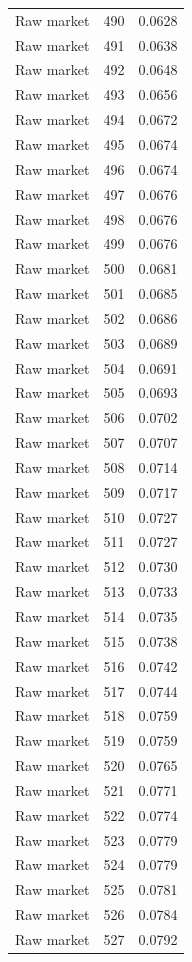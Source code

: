 \begin{table}[htbp]
\begin{tabular}{lll}
Raw market & 490 & 0.0628 \\
Raw market & 491 & 0.0638 \\
Raw market & 492 & 0.0648 \\
Raw market & 493 & 0.0656 \\
Raw market & 494 & 0.0672 \\
Raw market & 495 & 0.0674 \\
Raw market & 496 & 0.0674 \\
Raw market & 497 & 0.0676 \\
Raw market & 498 & 0.0676 \\
Raw market & 499 & 0.0676 \\
Raw market & 500 & 0.0681 \\
Raw market & 501 & 0.0685 \\
Raw market & 502 & 0.0686 \\
Raw market & 503 & 0.0689 \\
Raw market & 504 & 0.0691 \\
Raw market & 505 & 0.0693 \\
Raw market & 506 & 0.0702 \\
Raw market & 507 & 0.0707 \\
Raw market & 508 & 0.0714 \\
Raw market & 509 & 0.0717 \\
Raw market & 510 & 0.0727 \\
Raw market & 511 & 0.0727 \\
Raw market & 512 & 0.0730 \\
Raw market & 513 & 0.0733 \\
Raw market & 514 & 0.0735 \\
Raw market & 515 & 0.0738 \\
Raw market & 516 & 0.0742 \\
Raw market & 517 & 0.0744 \\
Raw market & 518 & 0.0759 \\
Raw market & 519 & 0.0759 \\
Raw market & 520 & 0.0765 \\
Raw market & 521 & 0.0771 \\
Raw market & 522 & 0.0774 \\
Raw market & 523 & 0.0779 \\
Raw market & 524 & 0.0779 \\
Raw market & 525 & 0.0781 \\
Raw market & 526 & 0.0784 \\
Raw market & 527 & 0.0792 \\

\end{tabular}
\end{table}
